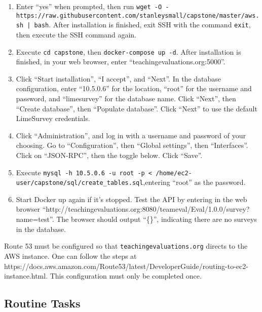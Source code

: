 \documentclass{article}
\begin{document}
\begin{enumerate}
    \item Enter ``yes'' when prompted, then run \verb+wget -O - https://raw.githubusercontent.com+\newline\verb+/stanleysmall/capstone/master/aws.sh | bash+. After installation is finished, exit SSH with the command \verb|exit|, then execute the SSH command again.

    \item Execute \verb|cd capstone|, then \verb|docker-compose up -d|. After installation is finished, in your web \newline browser, enter ``teachingevaluations.org:5000''.

    \item Click ``Start installation'', ``I accept'', and ``Next''. In the database configuration, enter ``10.5.0.6'' for the location, ``root'' for the username and password, and ``limesurvey'' for the database name. Click ``Next'', then ``Create database'', then ``Populate database''. Click ``Next'' to use the default LimeSurvey credentials.

    \item Click ``Administration'', and log in with a username and password of your choosing. Go to ``Configuration'', then ``Global settings'', then ``Interfaces''. Click on ``JSON-RPC'', then the toggle below. Click ``Save''.

    \item Execute \verb|mysql -h 10.5.0.6 -u root -p < /home/ec2-user/capstone/sql/create_tables.sql|,\newline entering ``root'' as the password.

    \item Start Docker up again if it's stopped. Test the API by entering in the web browser ``http://\newline teachingevaluations.org:8080/teameval/Eval/1.0.0/survey?name=test''. The browser should output ``\{\}'', indicating there are no surveys in the database.
\end{enumerate}

\vspace{4mm}

Route 53 must be configured so that \verb|teachingevaluations.org| directs to the AWS instance. One can follow the steps at https://docs.aws.amazon.com/Route53/latest/DeveloperGuide/routing-to-ec2-instance\newline .html. This configuration must only be completed once. 

\subsection{Routine Tasks}
\end{document}
